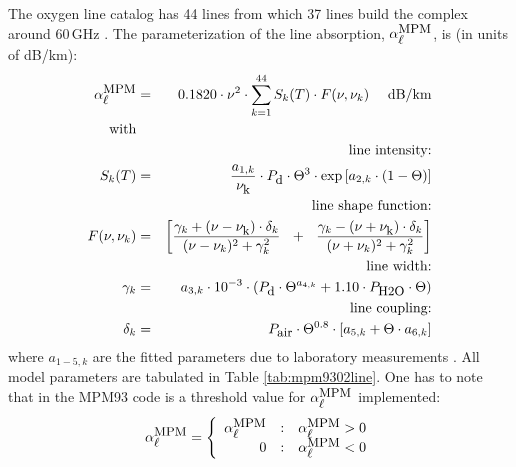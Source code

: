 {
\label{levele:mpm93_o2lines}
The oxygen line catalog has 44 lines from which 37 lines build the 
complex around 60\,GHz \citep{liebeetal:93}. The parameterization 
of the line absorption, $\alpha^{\mbox{\rm \small MPM}}_{\mbox{\small $\ell$}}$, is (in units of dB/km):
\begin{eqnarray}
  \alphampml & = & 0.1820 \cdot \nu^2 \cdot  
                   \sum_{k=1}^{44}{S_k(T) \cdot F(\nu,\nu_k)}~~~~\mbox{dB/km}\\
%
 \mbox{with} &   &\nonumber\\
%
 & & \mbox{line intensity:} \nonumber\\
      \label{eq:MPM93:O2_inten}
      S_k(T) & = & \frac{a_{1,k}}{\nuk} \cdot \pda \cdot \Theta^3 \cdot 
                   \exp{[a_{2,k} \cdot (1-\Theta)]}\\
 & & \mbox{line shape function:}  \nonumber\\
 F(\nu,\nu_k) & = & \left[\frac{\gamma_k+(\nu-\nuk)\cdot \delta_k}
                               {(\nu-\nu_k)^2+\gamma_k^2}~~+~~
                          \frac{\gamma_k-(\nu+\nuk)\cdot \delta_k}
                               {(\nu+\nu_k)^2+\gamma_k^2}\right] \nonumber\\
 & & \mbox{line width:}  \nonumber\\
     \label{eq:MPM93:O2_gamma}
     \gamma_k & = & a_{3,k} \cdot 10^{-3} \cdot 
                 \left( \pda  \cdot \Theta^{a_{4,k}} + 
                        1.10 \cdot \phzo \cdot \Theta \right)\\
& &  \mbox{line coupling:}  \nonumber\\
     \label{eq:MPM93:O2_coupling}
     \delta_k & = & \pdair \cdot \Theta^{0.8} \cdot 
                   \left[ a_{5,k} + \Theta \cdot a_{6,k} \right]\nonumber
\nonumber
\end{eqnarray}
%
where $a_{1-5,k}$ are the fitted parameters due to laboratory measurements 
\cite{liebeetal:92}. All model parameters are tabulated in 
Table \ref{tab:mpm9302line}. One has to note that in the MPM93 code is a 
threshold value for $\alpha^{\mbox{\rm \small MPM}}_{\mbox{\small $\ell$}}$ implemented:
\begin{equation}
 \label{eq:mpm93O2limit}
  \alphampml = 
   \left \{ \begin{array}{r@{\quad:\quad}l} 
    \alphampml & \alphampml > 0\\
    0          & \alphampml < 0
                       \end{array} \right.

\end{equation}}

